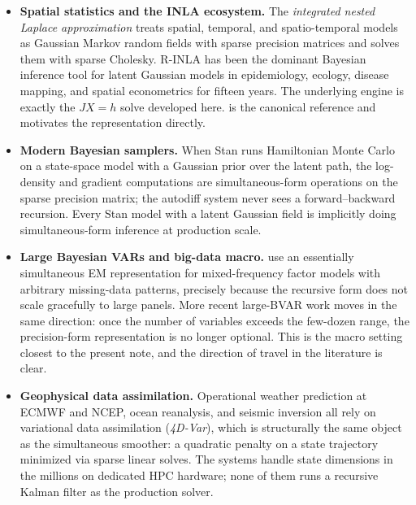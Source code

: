 \documentclass[11pt]{article}
\begin{document}
\begin{itemize}[leftmargin=2em,itemsep=4pt]

\item \textbf{Spatial statistics and the INLA ecosystem.}  The
\emph{integrated nested Laplace approximation} \citep{RueMartinoChopin2009}
treats spatial, temporal, and spatio-temporal models as Gaussian
Markov random fields with sparse precision matrices and solves them
with sparse Cholesky.  R-INLA has been the dominant Bayesian
inference tool for latent Gaussian models in epidemiology, ecology,
disease mapping, and spatial econometrics for fifteen years.  The
underlying engine is exactly the $JX=h$ solve developed here.
\citet{RueHeld2005} is the canonical reference and motivates the
representation directly.

\item \textbf{Modern Bayesian samplers.}  When Stan
\citep{Carpenter2017} runs Hamiltonian Monte Carlo on a state-space
model with a Gaussian prior over the latent path, the log-density
and gradient computations are simultaneous-form operations on the
sparse precision matrix; the autodiff system never sees a
forward--backward recursion.  Every Stan model with a latent
Gaussian field is implicitly doing simultaneous-form inference at
production scale.

\item \textbf{Large Bayesian VARs and big-data macro.}
\citet{BanburaModugno2014} use an essentially simultaneous EM
representation for mixed-frequency factor models with arbitrary
missing-data patterns, precisely because the recursive form does
not scale gracefully to large panels.  More recent large-BVAR work
\citep{GiannoneLenzaPrimiceri2015} moves in the same direction:
once the number of variables exceeds the few-dozen range, the
precision-form representation is no longer optional.  This is the
macro setting closest to the present note, and the direction of
travel in the literature is clear.

\item \textbf{Geophysical data assimilation.}  Operational weather
prediction at ECMWF and NCEP, ocean reanalysis, and seismic
inversion all rely on variational data assimilation (\emph{4D-Var}),
which is structurally the same object as the simultaneous smoother:
a quadratic penalty on a state trajectory minimized via sparse
linear solves.  The systems handle state dimensions in the millions
on dedicated HPC hardware; none of them runs a recursive Kalman
filter as the production solver.


\end{itemize}
\end{document}

